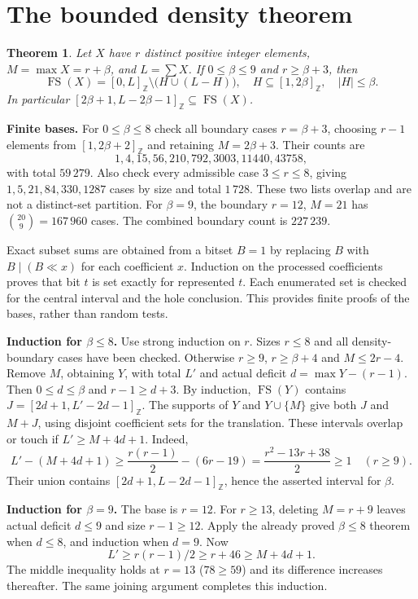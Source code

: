 \documentclass[11pt,a4paper]{article}
\newcommand{\FS}{\operatorname{FS}}
\newcommand{\Z}{\mathbb Z}
\newcommand{\ints}[2]{[#1,#2]_{\Z}}
\newtheorem{theorem}{Theorem}
\begin{document}
\section{The bounded density theorem}
\begin{theorem}\label{dense}
Let $X$ have $r$ distinct positive integer elements, $M=\max X=r+\beta$, and $L=\sum X$. If $0\le\beta\le9$ and $r\ge\beta+3$, then
\[
\FS(X)=\ints0L\setminus\bigl(H\cup(L-H)\bigr),\quad
H\subseteq\ints1{2\beta},\quad |H|\le\beta.
\]
In particular $\ints{2\beta+1}{L-2\beta-1}\subseteq\FS(X)$.
\end{theorem}
\textbf{Finite bases.} For $0\le\beta\le8$ check all boundary cases $r=\beta+3$, choosing $r-1$ elements from $\ints1{2\beta+2}$ and retaining $M=2\beta+3$. Their counts are
\[
1,4,15,56,210,792,3003,11440,43758,
\]
with total $59\,279$. Also check every admissible case $3\le r\le8$, giving $1,5,21,84,330,1287$ cases by size and total $1\,728$. These two lists overlap and are not a distinct-set partition. For $\beta=9$, the boundary $r=12$, $M=21$ has $\binom{20}{9}=167\,960$ cases. The combined boundary count is $227\,239$.

Exact subset sums are obtained from a bitset $B=1$ by replacing $B$ with $B\mathbin{|}(B\ll x)$ for each coefficient $x$. Induction on the processed coefficients proves that bit $t$ is set exactly for represented $t$. Each enumerated set is checked for the central interval and the hole conclusion. This provides finite proofs of the bases, rather than random tests.

\textbf{Induction for $\beta\le8$.} Use strong induction on $r$. Sizes $r\le8$ and all density-boundary cases have been checked. Otherwise $r\ge9$, $r\ge\beta+4$ and $M\le2r-4$. Remove $M$, obtaining $Y$, with total $L'$ and actual deficit $d=\max Y-(r-1)$. Then $0\le d\le\beta$ and $r-1\ge d+3$. By induction, $\FS(Y)$ contains $J=\ints{2d+1}{L'-2d-1}$. The supports of $Y$ and $Y\cup\{M\}$ give both $J$ and $M+J$, using disjoint coefficient sets for the translation. These intervals overlap or touch if $L'\ge M+4d+1$. Indeed,
\[
L'-(M+4d+1)\ge\frac{r(r-1)}2-(6r-19)
=\frac{r^2-13r+38}2\ge1\quad(r\ge9).
\]
Their union contains $\ints{2d+1}{L-2d-1}$, hence the asserted interval for $\beta$.

\textbf{Induction for $\beta=9$.} The base is $r=12$. For $r\ge13$, deleting $M=r+9$ leaves actual deficit $d\le9$ and size $r-1\ge12$. Apply the already proved $\beta\le8$ theorem when $d\le8$, and induction when $d=9$. Now
\[
L'\ge r(r-1)/2\ge r+46\ge M+4d+1.
\]
The middle inequality holds at $r=13$ ($78\ge59$) and its difference increases thereafter. The same joining argument completes this induction.
\end{document}
